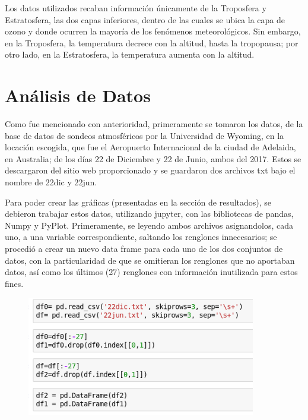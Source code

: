 \documentclass[a4paper]{article}
\begin{document}
Los datos utilizados recaban información únicamente de la Troposfera y Estratosfera, las dos capas inferiores, dentro de las cuales se ubica la capa de ozono y donde ocurren la mayoría de los fenómenos meteorológicos. Sin embargo, en la Troposfera, la temperatura decrece con la altitud, hasta la tropopausa; por otro lado, en la Estratosfera, la temperatura aumenta con la altitud. 

\section {Análisis de Datos}

Como fue mencionado con anterioridad, primeramente se tomaron los datos, de la base de datos de sondeos atmosféricos por la Universidad de Wyoming, en la locación escogida, que fue el Aeropuerto Internacional de la ciudad de Adelaida, en Australia; de los días 22 de Diciembre y 22 de Junio, ambos del 2017. Estos se descargaron del sitio web proporcionado y se guardaron dos archivos txt bajo el nombre de 22dic y 22jun.

Para poder crear las gráficas (presentadas en la sección de resultados), se debieron trabajar estos datos, utilizando jupyter, con las bibliotecas de pandas, Numpy y PyPlot. Primeramente, se leyendo ambos archivos asignandolos, cada uno, a una variable correspondiente, saltando los renglones innecesarios; se procedió a crear un nuevo data frame para cada uno de los dos conjuntos de datos, con la particularidad de que se omitieran los renglones que no aportaban datos, así como los últimos (27) renglones con información inutilizada para estos fines.

\begin{figure}[h!]
  \includegraphics[width=10cm]{1.png}
  \centering
  \label{fig:1}
\end{figure}
\end{document}
